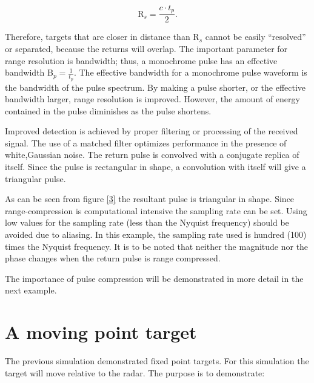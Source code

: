 \documentclass[thmsa,a4paper,ukenglish]{report}
\begin{document}
\[
\text{R}_{s}=\frac{c\cdot t_{p}}{2}. 
\]
\smallskip

Therefore, targets that are closer in distance than R$_{s}$ cannot be easily
``resolved'' or separated, because the returns will overlap. The important
parameter for range resolution is bandwidth; thus, a monochrome pulse has an
effective bandwidth B$_{p}=\frac{1}{t_{p}}$. The effective bandwidth for a
monochrome pulse waveform is the bandwidth of the pulse spectrum. By making
a pulse shorter, or the effective bandwidth larger, range resolution is
improved. However, the amount of energy contained in the pulse diminishes as
the pulse shortens.

Improved detection is achieved by proper filtering or processing of the
received signal. The use of a matched filter optimizes performance in the
presence of white,Gaussian noise. The return pulse is convolved with a
conjugate replica of itself. Since the pulse is rectangular in shape, a
convolution with itself will give a triangular pulse.

As can be seen from figure \ref{3} the resultant pulse is triangular in
shape. Since range-compression is computational intensive the sampling rate
can be set. Using low values for the sampling rate (less than the Nyquist
frequency) should be avoided due to aliasing. In this example, the sampling
rate used is hundred (100) times the Nyquist frequency. It is to be noted
that neither the magnitude nor the phase changes when the return pulse is
range compressed.\smallskip {}

The importance of pulse compression will be demonstrated in more detail in
the next example.

\section{\protect\smallskip \protect\smallskip A moving point target}

The previous simulation demonstrated fixed point targets. For this
simulation the target will move relative to the radar. The purpose is to
demonstrate:
\end{document}
